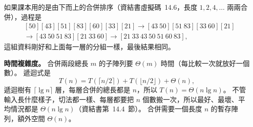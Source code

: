 \begin{pastsoln}
如果課本用的是由下而上的合併排序（資結書虛擬碼~14.6，長度 $1, 2, 4, \ldots$ 兩兩合併），過程是
\begin{align*}
&[50][43][51][83][60][33][21] \to [43\ 50][51\ 83][33\ 60][21] \\
&\to [43\ 50\ 51\ 83][21\ 33\ 60] \to [21\ 33\ 43\ 50\ 51\ 60\ 83],
\end{align*}
這組資料剛好和上面每一層的分組一樣，最後結果相同。

\textbf{時間複雜度。} 合併兩段總長 $m$ 的子陣列要 $\Theta(m)$ 時間（每比較一次就放好一個數）。
遞迴式是
\[
T(n) = T(\lceil n/2 \rceil) + T(\lfloor n/2 \rfloor) + \Theta(n),
\]
遞迴樹有 $\lceil \lg n \rceil$ 層，每層合併的總長都是 $n$，所以 $T(n) = \Theta(n \lg n)$。 不管
輸入長什麼樣子，切法都一樣、每層都要把 $n$ 個數搬一次，所以最好、最壞、平均情況都是
$\Theta(n \lg n)$（資結書第~14.4~節）。 合併需要一個長度 $n$ 的暫存陣列，額外空間 $\Theta(n)$。
\end{pastsoln}

